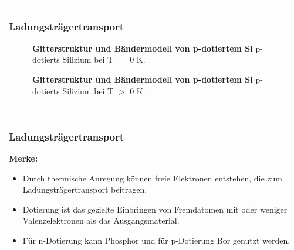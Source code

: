 \begin{frame}
    \b{\frametitle{Ladungsträgertransport}
    \begin{minipage}[t]{0.48\textwidth}
        \begin{figure}[H]
            \centering
            
            \caption{\textbf{Gitterstruktur und Bändermodell von p-dotiertem Si} p-dotierts Silizium bei T $=$ 0 K.}  
            \label{fig:GitterstrukturUndBaendermodellVonP-DotiertesSi-1}
        \end{figure}
    \end{minipage}
    \begin{minipage}[t]{0.48\textwidth}
        \begin{figure}[H]
            \centering
            
            \caption{\textbf{Gitterstruktur und Bändermodell von p-dotiertem Si} p-dotierts Silizium bei T $>$ 0 K.}  
            \label{fig:GitterstrukturUndBaendermodellVonP-DotiertesSi-2}
        \end{figure}
    \end{minipage}
    }

\end{frame}

\begin{frame}
    \b{
    \frametitle{Ladungsträgertransport}
    \textbf{Merke:}
    \begin{itemize}
        \item Durch thermische Anregung können freie Elektronen entstehen, die zum Ladungsträgertransport beitragen. 
        \item Dotierung ist das gezielte Einbringen von Fremdatomen mit oder weniger Valenzelektronen als das Ausgangsmaterial.
        \item Für n-Dotierung kann Phosphor und für p-Dotierung Bor genutzt werden.
    \end{itemize}}
\end{frame}

